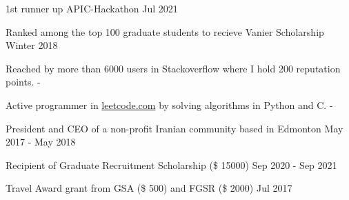 \documentclass[letter,11pt]{article}
\begin{document}
 	1st runner up APIC-Hackathon	\hfill Jul 2021
 	
 	Ranked among the top 100 graduate students to recieve Vanier Scholarship	\hfill Winter 2018
 	
 	Reached by more than 6000 users in Stackoverflow where I hold 200 reputation points. \hfill -
 	
 	Active programmer in \href{www.leetcode.com}{leetcode.com}  by solving algorithms in Python and C. \hfill -
 	
 	President and CEO of a non-profit Iranian community based in Edmonton \hfill May 2017 - May 2018
 	
 	Recipient of Graduate Recruitment Scholarship (\$ 15000) \hfill Sep 2020 - Sep 2021
 	
 	Travel Award grant from GSA (\$ 500) and FGSR (\$ 2000) \hfill Jul 2017
 
\end{document}
